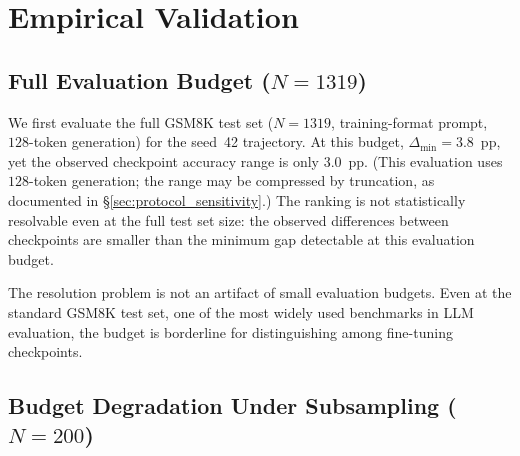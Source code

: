\documentclass[pdflatex,sn-mathphys-ay,iicol]{sn-jnl}
\theoremstyle{thmstylethree}
\begin{document}
\section{Empirical Validation}\label{sec:primary}

\subsection{Full Evaluation Budget ($N=1319$)}\label{sec:full_budget}

We first evaluate the full GSM8K test set ($N=1319$, training-format prompt, $128$-token generation) for the seed~42 trajectory. At this budget, $\Delta_{\min}=3.8$~pp, yet the observed checkpoint accuracy range is only $3.0$~pp. (This evaluation uses $128$-token generation; the range may be compressed by truncation, as documented in \S\ref{sec:protocol_sensitivity}.) The ranking is not statistically resolvable even at the full test set size: the observed differences between checkpoints are smaller than the minimum gap detectable at this evaluation budget.

The resolution problem is not an artifact of small evaluation budgets. Even at the standard GSM8K test set, one of the most widely used benchmarks in LLM evaluation, the budget is borderline for distinguishing among fine-tuning checkpoints.

\subsection{Budget Degradation Under Subsampling ($N=200$)}\label{sec:budget_degradation}
\end{document}
